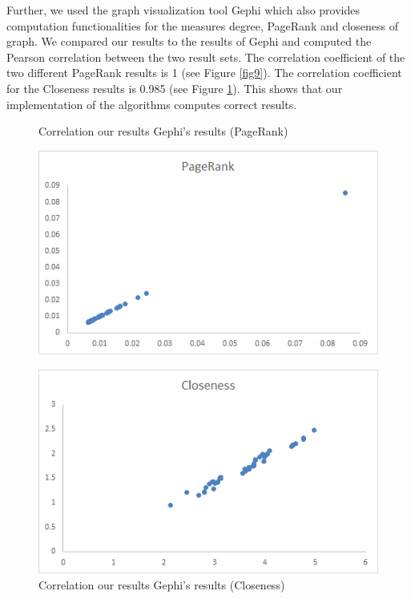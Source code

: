 Further, we used the graph visualization tool Gephi which also provides computation functionalities for the measures degree, PageRank and closeness of graph. We compared our results to the results of Gephi and computed the Pearson correlation between the two result sets. The correlation coefficient of the two different PageRank results is 1 (see Figure \ref{fig9}). The correlation coefficient for the Closeness results is 0.985 (see Figure \ref{fig10}). This shows that our implementation of the algorithms computes correct results.

\begin{figure}[H]
\begin{minipage}{.5\textwidth}
	\begin{center}
		\caption{Correlation our results Gephi’s results (PageRank)}		
		\label{fig9}		
		\includegraphics[width=1.0\textwidth]{fig9}	
	\end{center}
\end{minipage} %
\begin{minipage}{.5\textwidth}
	\begin{center}
		\caption{Correlation our results Gephi’s results (Closeness)}		
		\label{fig10}		
		\includegraphics[width=1.0\textwidth]{fig10}	
	\end{center}
\end{minipage}
\end{figure}

